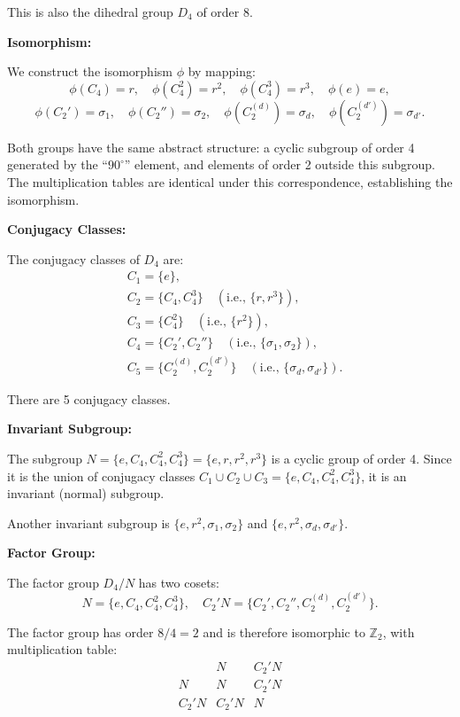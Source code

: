 \documentclass[12pt]{article}
\begin{document}
This is also the dihedral group $D_4$ of order 8.

\medskip
\noindent\textbf{Isomorphism:}

We construct the isomorphism $\phi$ by mapping:
\[
\phi(C_4) = r, \quad \phi(C_4^2) = r^2, \quad \phi(C_4^3) = r^3, \quad \phi(e) = e,
\]
\[
\phi(C_2') = \sigma_1, \quad \phi(C_2'') = \sigma_2, \quad \phi(C_2^{(d)}) = \sigma_d, \quad \phi(C_2^{(d')}) = \sigma_{d'}.
\]

Both groups have the same abstract structure: a cyclic subgroup of order 4 generated by the ``$90^\circ$'' element, and elements of order 2 outside this subgroup. The multiplication tables are identical under this correspondence, establishing the isomorphism.

\medskip
\noindent\textbf{Conjugacy Classes:}

The conjugacy classes of $D_4$ are:
\begin{align*}
&C_1 = \{e\}, \\
&C_2 = \{C_4, C_4^3\} \quad (\text{i.e., } \{r, r^3\}), \\
&C_3 = \{C_4^2\} \quad (\text{i.e., } \{r^2\}), \\
&C_4 = \{C_2', C_2''\} \quad (\text{i.e., } \{\sigma_1, \sigma_2\}), \\
&C_5 = \{C_2^{(d)}, C_2^{(d')}\} \quad (\text{i.e., } \{\sigma_d, \sigma_{d'}\}).
\end{align*}

There are 5 conjugacy classes.

\medskip
\noindent\textbf{Invariant Subgroup:}

The subgroup $N = \{e, C_4, C_4^2, C_4^3\} = \{e, r, r^2, r^3\}$ is a cyclic group of order 4. Since it is the union of conjugacy classes $C_1 \cup C_2 \cup C_3 = \{e, C_4, C_4^2, C_4^3\}$, it is an invariant (normal) subgroup.

Another invariant subgroup is $\{e, r^2, \sigma_1, \sigma_2\}$ and $\{e, r^2, \sigma_d, \sigma_{d'}\}$.

\medskip
\noindent\textbf{Factor Group:}

The factor group $D_4/N$ has two cosets:
\[
N = \{e, C_4, C_4^2, C_4^3\}, \quad C_2' N = \{C_2', C_2'', C_2^{(d)}, C_2^{(d')}\}.
\]

The factor group has order $8/4 = 2$ and is therefore isomorphic to $\mathbb{Z}_2$, with multiplication table:
\[
\begin{array}{c|cc}
 & N & C_2'N \\
\hline
N & N & C_2'N \\
C_2'N & C_2'N & N
\end{array}
\]
\end{document}
